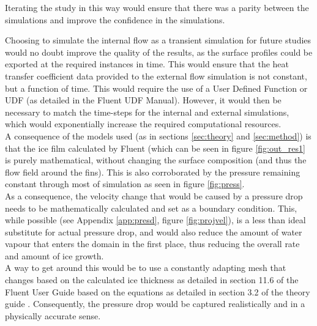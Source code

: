 \documentclass[11pt,a4paper,twoside,oneside]{article}
\begin{document}
Iterating the study in this way would ensure that there was a parity between the simulations and improve the confidence in the simulations.

Choosing to simulate the internal flow as a transient simulation for future studies would no doubt improve the quality of the results, as the surface profiles could be exported at the required instances in time. This would ensure that the heat transfer coefficient data provided to the external flow simulation is not constant, but a function of time. This would require the use of a User Defined Function or UDF (as detailed in the Fluent UDF Manual\cite{fludf}). However, it would then be necessary to match the time-steps for the internal and external simulations, which would exponentially increase the required computational resources.\\

A consequence of the models used (as in sections \ref{sec:theory} and \ref{sec:method}) is that the ice film calculated by Fluent (which can be seen in figure \ref{fig:out_res1} is purely mathematical, without changing the surface composition (and thus the flow field around the fins). This is also corroborated by the pressure remaining constant through most of simulation as seen in figure \ref{fig:press}.\\
As a consequence, the velocity change that would be caused by a pressure drop needs to be mathematically calculated and set as a boundary condition. This, while possible (see Appendix \ref{app:presd}, figure \ref{fig:projvel}), is a less than ideal substitute for actual pressure drop, and would also reduce the amount of water vapour that enters the domain in the first place, thus reducing the overall rate and amount of ice growth.\\
A way to get around this would be to use a constantly adapting mesh that changes based on the calculated ice thickness as detailed in section 11.6 of the Fluent User Guide \cite{flug} based on the equations as detailed in section 3.2 of the theory guide \cite{fluth}. Consequently, the pressure drop would be captured realistically and in a physically accurate sense.
\end{document}
